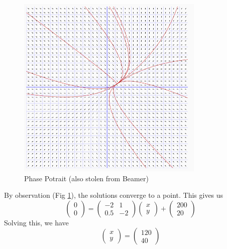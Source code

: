 \documentclass[12pt]{article}
\begin{document}
\begin{figure}
	\centering
	\includegraphics[width=\textwidth]{phasepotraitb.png}
	\caption{Phase Potrait (also stolen from Beamer)}
	\label{potb}
\end{figure}

By observation (Fig \ref{potb}), the solutions converge to a point. This gives us
$$\begin{pmatrix} 0 \\ 0 \end{pmatrix} = \begin{pmatrix} -2 & 1 \\ 0.5 & -2 \end{pmatrix} \begin{pmatrix} x \\ y \end{pmatrix} + \begin{pmatrix} 200 \\ 20 \end{pmatrix}$$
Solving this, we have
$$\begin{pmatrix} x \\ y \end{pmatrix} = \begin{pmatrix} 120 \\ 40 \end{pmatrix}$$
\end{document}
